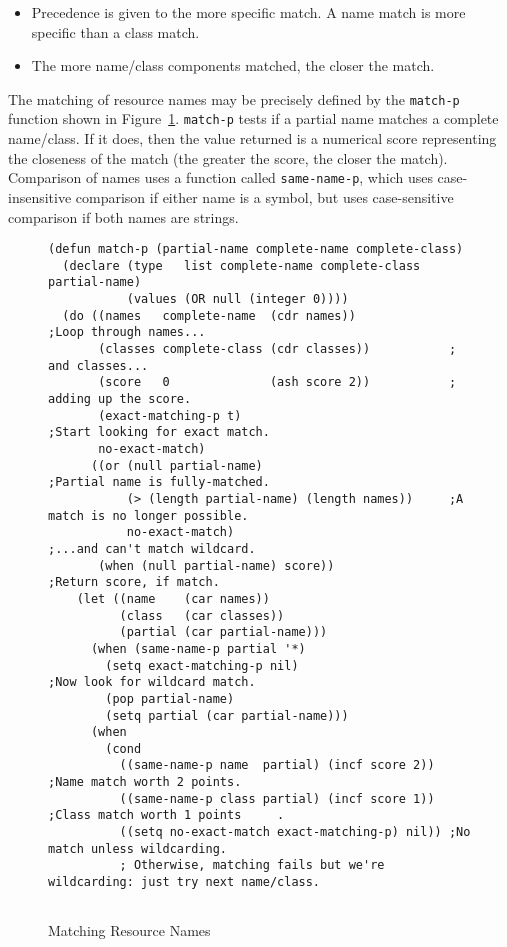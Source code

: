 \documentclass[twoside]{book}
\begin{document}
\begin{sloppy}
\begin{itemize}
\item Precedence is given to the more specific match. A name match is more
specific than a class match. 

\item The more name/class components matched, the closer the match.
\end{itemize}

The matching of resource names may be precisely defined by the {\tt match-p}
function shown in Figure~\ref{fig:match-p}. {\tt match-p} tests if a partial
name matches a complete
name/class. If it does, then the value returned is a numerical score
representing the closeness of the match (the greater the score, the closer the
match). Comparison of names uses a function called {\tt same-name-p}, which uses
case-insensitive comparison if either name is a symbol, but  uses
case-sensitive comparison if both names are strings.

\begin{figure}[hb]
\caption{Matching Resource Names}
\label{fig:match-p}
\begin{verbatim}
(defun match-p (partial-name complete-name complete-class) 
  (declare (type   list complete-name complete-class partial-name)
           (values (OR null (integer 0))))  
  (do ((names   complete-name  (cdr names))             ;Loop through names...
       (classes complete-class (cdr classes))           ;  and classes...
       (score   0              (ash score 2))           ;  adding up the score.
       (exact-matching-p t)                             ;Start looking for exact match.
       no-exact-match)
      ((or (null partial-name)                          ;Partial name is fully-matched.
           (> (length partial-name) (length names))     ;A match is no longer possible.
           no-exact-match)                              ;...and can't match wildcard.
       (when (null partial-name) score))                ;Return score, if match.     
    (let ((name    (car names))
          (class   (car classes))
          (partial (car partial-name)))
      (when (same-name-p partial '*)
        (setq exact-matching-p nil)                     ;Now look for wildcard match.
        (pop partial-name)
        (setq partial (car partial-name)))
      (when
        (cond
          ((same-name-p name  partial) (incf score 2))  ;Name match worth 2 points. 
          ((same-name-p class partial) (incf score 1))  ;Class match worth 1 points     .       
          ((setq no-exact-match exact-matching-p) nil)) ;No match unless wildcarding.
          ; Otherwise, matching fails but we're wildcarding: just try next name/class.
                       

\end{verbatim}
\end{figure}
\end{sloppy}
\end{document}
